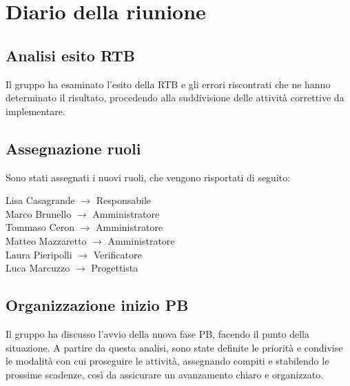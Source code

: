 \section{Diario della riunione}
\subsection{Analisi esito RTB}
Il gruppo ha esaminato l’esito della RTB e gli errori riscontrati che ne hanno determinato il risultato, procedendo alla suddivisione delle attività correttive da implementare.

\subsection{Assegnazione ruoli}
Sono stati assegnati i nuovi ruoli, che vengono risportati di seguito:
\begin{center}
    Lisa Casagrande $\rightarrow$ Responsabile \\
	Marco Brunello $\rightarrow$ Amministratore \\
	Tommaso Ceron $\rightarrow$ Amministratore \\
	Matteo Mazzaretto $\rightarrow$ Amministratore\\
	Laura Pieripolli $\rightarrow$ Verificatore \\
	Luca Marcuzzo $\rightarrow$ Progettista \\
\end{center}

\subsection{Organizzazione inizio PB}
Il gruppo ha discusso l’avvio della nuova fase PB, facendo il punto della situazione.
A partire da questa analisi, sono state definite le priorità e condivise le modalità con cui proseguire le attività, assegnando compiti e stabilendo le prossime scadenze, così da assicurare un avanzamento chiaro e organizzato.